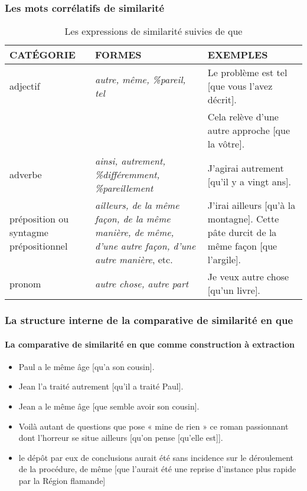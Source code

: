 \documentclass[UTF8]{report}
\begin{document}
\subsubsection{Les mots corrélatifs de similarité}

\begin{table}[H]
    \centering
    \small
    \begin{tabular}{|p{3.5cm}|>{\RaggedRight}p{6cm}|>{\RaggedRight}p{6.5cm}|}
    \hline
    \rowcolor{cyan!20}
    \textbf{CATÉGORIE} & \textbf{FORMES} & \textbf{EXEMPLES} \\
    \hline
    adjectif & \textit{autre, même, \%pareil, tel} & Le problème est tel [que vous l'avez décrit]. \\
    & & Cela relève d'une autre approche [que la vôtre]. \\
    \hline
    adverbe & \textit{ainsi, autrement, \%différemment, \%pareillement} & J'agirai autrement [qu'il y a vingt ans]. \\
    \hline
    préposition ou syntagme prépositionnel & \textit{ailleurs, de la même façon, de la même manière, de même, d'une autre façon, d'une autre manière}, etc. & J'irai ailleurs [qu'à la montagne]. 
    \newline Cette pâte durcit de la même façon [que l'argile]. \\
    \hline
    pronom & \textit{autre chose, autre part} & Je veux autre chose [qu'un livre]. \\
    \hline
    \end{tabular}
    \caption{Les expressions de similarité suivies de que}
\end{table}

\subsubsection{La structure interne de la comparative de similarité en que}
\paragraph{La comparative de similarité en que comme construction à extraction}
\begin{itemize}
    \item Paul a le même âge [qu’a son cousin].
    \item Jean l’a traité autrement [qu’il a traité Paul].
    \item Jean a le même âge [que semble avoir son cousin].
    \item Voilà autant de questions que pose « mine de rien » ce roman passionnant dont l’horreur se situe ailleurs [qu’on pense [qu’elle est]].
    \item le dépôt par eux de conclusions aurait été sans incidence sur le déroulement de la procédure, de même [que l’aurait été une reprise d’instance plus rapide par la Région flamande]
\end{itemize}
\end{document}
